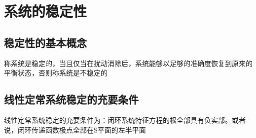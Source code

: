 \chapter{系统的稳定性}
\section{稳定性的基本概念}
\begin{definition}
    称系统是稳定的，当且仅当在扰动消除后，系统能够以足够的准确度恢复到原来的平衡状态，否则称系统是不稳定的
\end{definition}

\section{线性定常系统稳定的充要条件}
\begin{theorem}
    线性定常系统稳定的充要条件为：闭环系统特征方程的根全部具有负实部。或者说，闭环传递函数极点全部在S平面的左半平面
\end{theorem}

